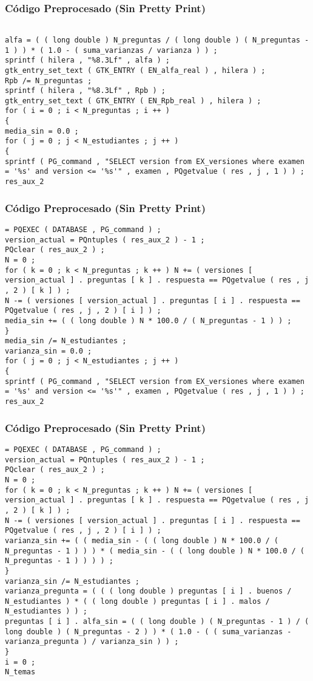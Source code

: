 \documentclass{beamer}
\begin{document}
\begin{frame}[fragile]
\frametitle{C\'odigo Preprocesado (Sin Pretty Print)}
\begin{lstlisting}[style=CStyle]

alfa = ( ( long double ) N_preguntas / ( long double ) ( N_preguntas - 1 ) ) * ( 1.0 - ( suma_varianzas / varianza ) ) ; 
sprintf ( hilera , "%8.3Lf" , alfa ) ; 
gtk_entry_set_text ( GTK_ENTRY ( EN_alfa_real ) , hilera ) ; 
Rpb /= N_preguntas ; 
sprintf ( hilera , "%8.3Lf" , Rpb ) ; 
gtk_entry_set_text ( GTK_ENTRY ( EN_Rpb_real ) , hilera ) ; 
for ( i = 0 ; i < N_preguntas ; i ++ ) 
{ 
media_sin = 0.0 ; 
for ( j = 0 ; j < N_estudiantes ; j ++ ) 
{ 
sprintf ( PG_command , "SELECT version from EX_versiones where examen = '%s' and version <= '%s'" , examen , PQgetvalue ( res , j , 1 ) ) ; 
res_aux_2 \end{lstlisting}
\end{frame}
\begin{frame}[fragile]
\frametitle{C\'odigo Preprocesado (Sin Pretty Print)}
\begin{lstlisting}[style=CStyle]
= PQEXEC ( DATABASE , PG_command ) ; 
version_actual = PQntuples ( res_aux_2 ) - 1 ; 
PQclear ( res_aux_2 ) ; 
N = 0 ; 
for ( k = 0 ; k < N_preguntas ; k ++ ) N += ( versiones [ version_actual ] . preguntas [ k ] . respuesta == PQgetvalue ( res , j , 2 ) [ k ] ) ; 
N -= ( versiones [ version_actual ] . preguntas [ i ] . respuesta == PQgetvalue ( res , j , 2 ) [ i ] ) ; 
media_sin += ( ( long double ) N * 100.0 / ( N_preguntas - 1 ) ) ; 
} 
media_sin /= N_estudiantes ; 
varianza_sin = 0.0 ; 
for ( j = 0 ; j < N_estudiantes ; j ++ ) 
{ 
sprintf ( PG_command , "SELECT version from EX_versiones where examen = '%s' and version <= '%s'" , examen , PQgetvalue ( res , j , 1 ) ) ; 
res_aux_2 \end{lstlisting}
\end{frame}
\begin{frame}[fragile]
\frametitle{C\'odigo Preprocesado (Sin Pretty Print)}
\begin{lstlisting}[style=CStyle]
= PQEXEC ( DATABASE , PG_command ) ; 
version_actual = PQntuples ( res_aux_2 ) - 1 ; 
PQclear ( res_aux_2 ) ; 
N = 0 ; 
for ( k = 0 ; k < N_preguntas ; k ++ ) N += ( versiones [ version_actual ] . preguntas [ k ] . respuesta == PQgetvalue ( res , j , 2 ) [ k ] ) ; 
N -= ( versiones [ version_actual ] . preguntas [ i ] . respuesta == PQgetvalue ( res , j , 2 ) [ i ] ) ; 
varianza_sin += ( ( media_sin - ( ( long double ) N * 100.0 / ( N_preguntas - 1 ) ) ) * ( media_sin - ( ( long double ) N * 100.0 / ( N_preguntas - 1 ) ) ) ) ; 
} 
varianza_sin /= N_estudiantes ; 
varianza_pregunta = ( ( ( long double ) preguntas [ i ] . buenos / N_estudiantes ) * ( ( long double ) preguntas [ i ] . malos / N_estudiantes ) ) ; 
preguntas [ i ] . alfa_sin = ( ( long double ) ( N_preguntas - 1 ) / ( long double ) ( N_preguntas - 2 ) ) * ( 1.0 - ( ( suma_varianzas - varianza_pregunta ) / varianza_sin ) ) ; 
} 
i = 0 ; 
N_temas \end{lstlisting}
\end{frame}
\end{document}
